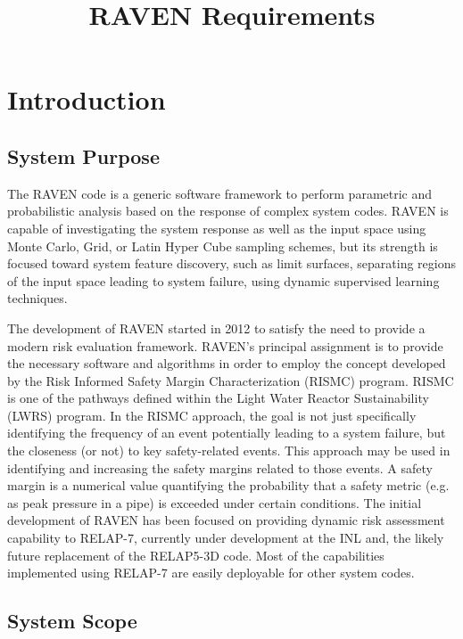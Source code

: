 \documentclass{article}
\title{RAVEN Requirements}
\begin{document}
\maketitle

\section{Introduction}

\subsection{System Purpose}

The RAVEN code is a generic software framework to perform parametric
and probabilistic analysis based on the response of complex system
codes. RAVEN is capable of investigating the system response as well
as the input space using Monte Carlo, Grid, or Latin Hyper Cube
sampling schemes, but its strength is focused toward system feature
discovery, such as limit surfaces, separating regions of the input
space leading to system failure, using dynamic supervised learning
techniques.

The development of RAVEN started in 2012 to satisfy the need to
provide a modern risk evaluation framework. RAVEN's principal
assignment is to provide the necessary software and algorithms in
order to employ the concept developed by the Risk Informed Safety
Margin Characterization (RISMC) program. RISMC is one of the pathways
defined within the Light Water Reactor Sustainability (LWRS)
program. In the RISMC approach, the goal is not just specifically
identifying the frequency of an event potentially leading to a system
failure, but the closeness (or not) to key safety-related events. This
approach may be used in identifying and increasing the safety margins
related to those events. A safety margin is a numerical value
quantifying the probability that a safety metric (e.g. as peak
pressure in a pipe) is exceeded under certain conditions. The initial
development of RAVEN has been focused on providing dynamic risk
assessment capability to RELAP-7, currently under development at the
INL and, the likely future replacement of the RELAP5-3D code. Most of
the capabilities implemented using RELAP-7 are easily deployable for
other system codes.

\subsection{System Scope}
\end{document}
